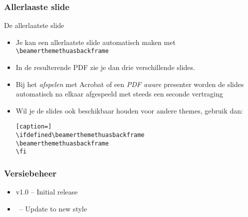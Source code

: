 \documentclass[fleqn,aspectratio=169,dutch,10pt]{beamer}
\begin{document}
\begin{frame}[fragile]
\frametitle{Allerlaaste slide}
De allerlaatste slide
\begin{itemize}
\item Je kan een allerlaatste slide automatisch maken met \lstinline|\beamerthemethuasbackframe|
\item In de resulterende PDF zie je dan drie verschillende slides.
\item Bij het \textsl{afspelen} met Acrobat of een \textsl{PDF aware} presenter worden de slides automatisch na elkaar afgespeeld met steeds een seconde vertraging
\item Wil je de slides ook beschikbaar houden voor andere themes, gebruik dan:
\begin{lstlisting}[caption=]
\ifdefined\beamerthemethuasbackframe
\beamerthemethuasbackframe
\fi
\end{lstlisting}
\end{itemize}
\end{frame}

\beamerthemethuasbackframe


\subtitle{Dit is een tweede titelslide}
\maketitle


\begin{frame}
\frametitle{Versiebeheer}
\begin{itemize}
\item v1.0 -- Initial release
\item \beamerthemethuasversion\ -- Update to new style
\end{itemize}
\end{frame}

%
%
%
%
\end{document}
